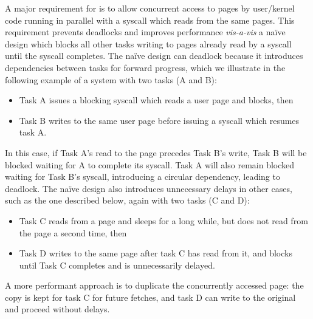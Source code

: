A major requirement for \midas is to allow concurrent access to pages
by user/kernel code running in parallel with a syscall which reads from
the same pages.
This requirement prevents deadlocks and improves performance \textit{vis-a-vis}
a na\"ive design which blocks all other tasks writing to pages already
read by a syscall until the syscall completes.
The na\"ive design can deadlock because it introduces dependencies between
tasks for forward progress, which we illustrate in the following example
of a system with two tasks (A and B):
\begin{itemize}
  \item Task A issues a blocking syscall which reads a user page and blocks, then
  \item Task B writes to the same user page before issuing a syscall which
  resumes task A.
\end{itemize}
In this case, if Task A's read to the page precedes Task B's write,
Task B will be blocked waiting for A to complete its syscall.
Task A will also remain blocked waiting for Task B's syscall,
introducing a circular dependency, leading to deadlock.
The na\"ive design also introduces unnecessary delays in other cases,
such as the one described below, again with two tasks (C and D):
\begin{itemize}
  \item Task C reads from a page and sleeps for a long while,
        but does not read from the page a second time, then
  \item Task D writes to the same page after task C has read from it,
        and blocks until Task C completes and is unnecessarily delayed.
\end{itemize}
A more performant approach is to duplicate the concurrently accessed page:
the copy is kept for task C for future fetches, and task D
can write to the original and proceed without delays.

